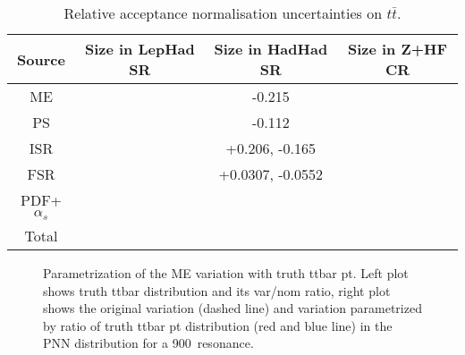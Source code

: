 \begin{table}
\centering
\small
\begin{tabular}{|c|c|c|c|}
\hline
Source & Size in LepHad SR & Size in HadHad SR & Size in Z+HF CR\\
\hline
ME &  & -0.215 & \\
PS &  &  -0.112 & \\
ISR &  & +0.206, -0.165 &  \\
FSR & & +0.0307, -0.0552 & \\
PDF+$\alpha_s$ &  &  &  \\
Total &  &  & \\
\hline
\end{tabular}
\caption{Relative acceptance normalisation uncertainties on $t\bar{t}$.}
\label{sec:systs:tab:systematics_normalisations_ttbar_LQ}
\end{table}


\begin{figure}[!h]
\centering
{} \quad
{} \quad
\caption{Parametrization of the ME variation with truth ttbar pt. Left plot shows truth ttbar distribution and its var/nom ratio, right plot shows the original variation (dashed line) and variation parametrized by ratio of truth ttbar pt distribution (red and blue line) in the PNN distribution for a 900~\GeV resonance.}
\label{fig:ttbarsyst_lephad_isr_PTBB}
\end{figure}


